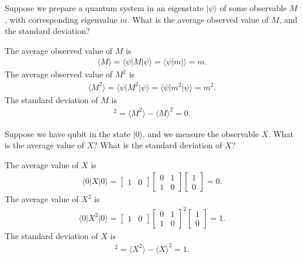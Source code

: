 \documentclass[en]{sol-man}
\begin{document}
\begin{exe}
    Suppose we prepare a quantum system in an eigenstate $\lvert\psi\rangle$ of some observable $M$, with corresponding eigenvalue $m$. What is the average observed value of $M$, and the standard deviation?
\end{exe}
\begin{sol}
    The average observed value of $M$ is
    \begin{align}
        \langle M\rangle=\langle\psi\rvert M\lvert\psi\rangle=\langle\psi\rvert m\lvert\rangle=m.
    \end{align}
    The average observed value of $M^2$ is
    \begin{align}
        \langle M^2\rangle=\langle\psi\rvert M^2\lvert\psi\rangle=\langle\psi\rvert m^2\lvert\psi\rangle=m^2.
    \end{align}
    The standard deviation of $M$ is
    \begin{align}
        [\Delta(M)]^2=\langle M^2\rangle-\langle M\rangle^2=0.
    \end{align}
\end{sol}

\begin{exe}
    Suppose we have qubit in the state $\lvert 0\rangle$, and we measure the observable $X$. What is the average value of $X$? What is the standard deviation of $X$?
\end{exe}
\begin{sol}
    The average value of $X$ is
    \begin{align}
        \langle 0\rvert X\lvert 0\rangle=\begin{bmatrix}
            1&0
        \end{bmatrix}\begin{bmatrix}
            0&1\\
            1&0
        \end{bmatrix}\begin{bmatrix}
            1\\
            0
        \end{bmatrix}=0.
    \end{align}
    The average value of $X^2$ is
    \begin{align}
        \langle 0\rvert X^2\lvert 0\rangle=\begin{bmatrix}
            1&0
        \end{bmatrix}\begin{bmatrix}
            0&1\\
            1&0
        \end{bmatrix}^2\begin{bmatrix}
            1\\
            0
        \end{bmatrix}=1.
    \end{align}
    The standard deviation of $X$ is
    \begin{align}
        [\Delta(X)]^2=\langle X^2\rangle-\langle X\rangle^2=1.
    \end{align}
\end{sol}
\end{document}
